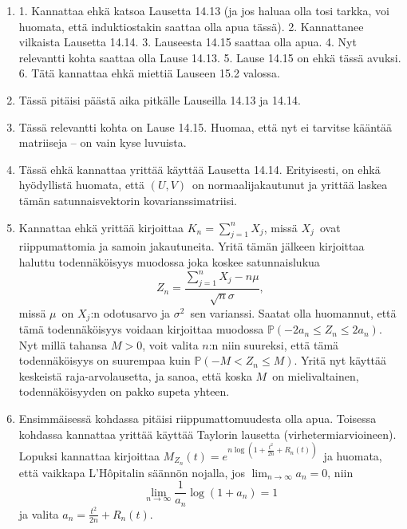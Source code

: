 \documentclass[11pt,a4paper]{amsart}
\newcommand{\1}{\mathbf{1}}
\renewcommand{\P}{\mathbb P}
\begin{document}
\begin{Solution}
\begin{enumerate}
\item 1. Kannattaa ehkä katsoa Lausetta 14.13 (ja jos haluaa olla tosi tarkka, voi huomata, että induktiostakin saattaa olla apua tässä). 2. Kannattanee vilkaista Lausetta 14.14. 3. Lauseesta 14.15 saattaa olla apua. 4. Nyt relevantti kohta saattaa olla Lause 14.13. 5. Lause 14.15 on ehkä tässä avuksi. 6. Tätä kannattaa ehkä miettiä Lauseen 15.2 valossa. 
\item Tässä pitäisi päästä aika pitkälle Lauseilla 14.13 ja 14.14.
\item Tässä relevantti kohta on Lause 14.15. Huomaa, että nyt ei tarvitse kääntää matriiseja -- on vain kyse luvuista.
\item Tässä ehkä kannattaa yrittää käyttää Lausetta 14.14. Erityisesti, on ehkä hyödyllistä huomata, että $(U,V)$ on normaalijakautunut ja yrittää laskea tämän satunnaisvektorin kovarianssimatriisi. 
\item Kannattaa ehkä yrittää kirjoittaa $K_n=\sum_{j=1}^nX_j$, missä $X_j$ ovat riippumattomia ja samoin jakautuneita. Yritä tämän jälkeen kirjoittaa haluttu todennäköisyys muodossa joka koskee satunnaislukua 
\[
Z_n=\frac{\sum_{j=1}^n X_j-n\mu}{\sqrt{n}\sigma},
\]
missä $\mu$ on $X_j$:n odotusarvo ja $\sigma^2$ sen varianssi. Saatat olla huomannut, että tämä todennäköisyys voidaan kirjoittaa muodossa $\P(-2a_n\leq Z_n\leq 2a_n)$. Nyt millä tahansa $M>0$, voit valita $n$:n niin suureksi, että tämä todennäköisyys on suurempaa kuin $\P(-M<Z_n\leq M)$. Yritä nyt käyttää keskeistä raja-arvolausetta, ja sanoa, että koska $M$ on mielivaltainen, todennäköisyyden on pakko supeta yhteen.
\item Ensimmäisessä kohdassa pitäisi riippumattomuudesta olla apua. Toisessa kohdassa kannattaa yrittää käyttää Taylorin lausetta (virhetermiarvioineen). Lopuksi kannattaa kirjoittaa $M_{Z_n}(t)=e^{n\log (1+\frac{t^2}{2n}+R_n(t))}$ ja huomata, että vaikkapa L'Hôpitalin säännön nojalla, jos $\lim_{n\to\infty}a_n=0$‚ niin 
\[
\lim_{n\to\infty}\frac{1}{a_n}\log(1+a_n)=1
\]
ja valita $a_n=\frac{t^2}{2n}+R_n(t)$.
\end{enumerate}
\end{Solution}
\end{document}
